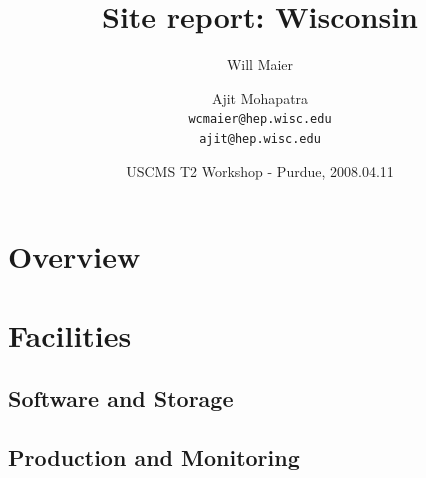 \documentclass{beamer}
\title{Site report: Wisconsin}
\author[Maier, Mohapatra]{
    Will Maier \and Ajit Mohapatra\\ 
    {\tt wcmaier@hep.wisc.edu}\\
    {\tt ajit@hep.wisc.edu}}
\institute[Wisconsin]{University of Wisconsin - High Energy Physics}
\date[2008.04.11]{USCMS T2 Workshop - Purdue, 2008.04.11}
\begin{document}
%
%
%


\begin{frame}
    \titlepage
\end{frame}

\section{Overview}
\begin{frame}
    \tableofcontents
\end{frame}

\section{Facilities}
\subsection{Software and Storage}
\begin{frame}
\frametitle{}
\end{frame}

\subsection{Production and Monitoring}
\begin{frame}
\frametitle{}
\end{frame}
\end{document}
